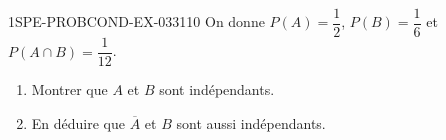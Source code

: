 \begin{exercice}{1SPE-PROBCOND-EX-033}{1}{10}
On donne $P(A) = \dfrac{1}{2}$, $P(B) = \dfrac{1}{6}$ et $P(A \cap B) = \dfrac{1}{12}$.

\begin{enumerate}
  \item Montrer que $A$ et $B$ sont indépendants.
  \item En déduire que $\overline{A}$ et $B$ sont aussi indépendants.
\end{enumerate}
\end{exercice}
